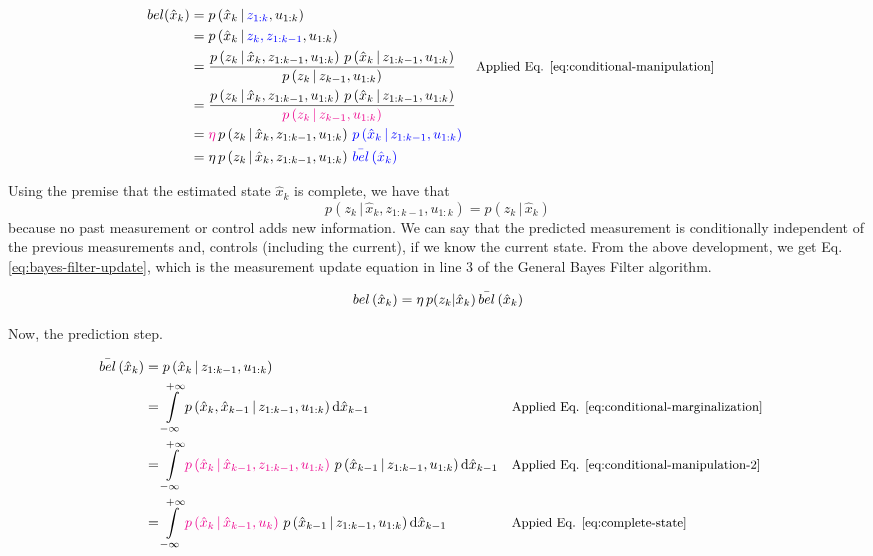 \documentclass[12pt]{article}
\newcommand{\bel}{\mathop{bel}} %
\newcommand{\given}{\,|\,} %
\newcommand{\parentheses}[1]{\left(#1\right)}
\newcommand{\belF}[1]{\mathop{bel}\parentheses{#1}} %
\newcommand{\pr}[1]{p\parentheses{#1}}
\newcommand{\Int}[4][x]{\int\limits_{#2}^{#3} #4 \dd #1}
\newcommand{\blue}[1]{\color{blue}#1\color{black}}
\newcommand{\magenta}[1]{\color{magenta}#1\color{black}}
\begin{document}
\begin{equation}
    \begin{aligned}
        \bel(\hat{x}_k) &= \pr{\hat{x}_k \given \blue{z_{1:k}}, u_{1:k}}\\
        &= \pr{\hat{x}_k \given \blue{z_k, z_{1:k-1}}, u_{1:k}} \\
        &= \dfrac{\pr{z_k \given \hat{x}_k, z_{1:k-1}, u_{1:k}} \, \pr{\hat{x}_k \given z_{1:k-1}, u_{1:k}}}{\pr{z_k \given z_{k-1}, u_{1:k}}} && \small\text{Applied Eq. \ref{eq:conditional-manipulation}}\\
        &= \dfrac{\pr{z_k \given \hat{x}_k, z_{1:k-1}, u_{1:k}} \, \pr{\hat{x}_k \given z_{1:k-1}, u_{1:k}}}{\magenta{\pr{z_k \given z_{k-1}, u_{1:k}}}}\\
        &= \magenta\eta \, \pr{z_k \given \hat{x}_k, z_{1:k-1}, u_{1:k}} \, \blue{\pr{\hat{x}_k \given z_{1:k-1}, u_{1:k}}}\\
        &= \eta \, \pr{z_k \given \hat{x}_k, z_{1:k-1}, u_{1:k}} \, \blue{\bar{\bel}\parentheses{\hat{x}_k}}
    \end{aligned}
\end{equation}

Using the premise that the estimated state $\hat{x}_k$ is complete, we have that 
\begin{equation}
 p(z_k \,|\, \hat{x}_k, z_{1:k-1}, u_{1:k}) = p(z_k \given \hat{x}_k)   
\end{equation}
because no past measurement or control adds new information. We can say that the predicted measurement is conditionally independent of the previous measurements and, controls (including the current), if we know the current state. From the above development, we get Eq. \ref{eq:bayes-filter-update}, which is the measurement update equation in line 3 of the General Bayes Filter algorithm.

\begin{equation}
    \belF{\hat{x}_k} = \eta \, p(z_k | \hat{x}_k) \color{black}\,\bar{\bel}\parentheses{\hat{x}_k}
    \label{eq:bayes-filter-update}
\end{equation}

Now, the prediction step.

\begin{equation}
\begin{aligned}
    \bar{\bel}\parentheses{\hat{x}_k} &= \pr{\hat{x}_k \given z_{1:k-1}, u_{1:k}} \\
    &= \Int[\hat{x}_{k-1}]{-\infty}{+\infty}{\pr{\hat{x}_k, \hat{x}_{k-1} \given z_{1:k-1}, u_{1:k}}} && \small\text{Applied Eq. \ref{eq:conditional-marginalization}} \\
    &= \Int[\hat{x}_{k-1}]{-\infty}{+\infty}{\magenta{\pr{\hat{x}_k \given \hat{x}_{k-1}, z_{1:k-1}, u_{1:k}}} \, \pr{\hat{x}_{k-1} \given z_{1:k-1}, u_{1:k}} } && \small\text{Applied Eq. \ref{eq:conditional-manipulation-2}}\\
    &= \Int[\hat{x}_{k-1}]{-\infty}{+\infty}{\magenta{\pr{\hat{x}_k \given \hat{x}_{k-1}, u_k}} \, \pr{\hat{x}_{k-1} \given z_{1:k-1}, u_{1:k}} } && \small\text{Appied Eq. \ref{eq:complete-state}}
\end{aligned}
\end{equation}
\end{document}
